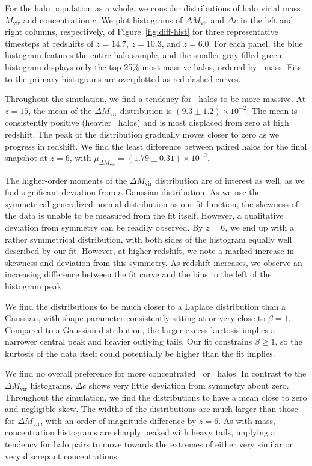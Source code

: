 For the halo population as a whole, we consider distributions of halo virial mass $M_{\mathrm{vir}}$ and concentration $c$.  We plot histograms of $\Delta M_{\mathrm{vir}}$ and $\Delta c$ in the left and right columns, respectively, of Figure~\ref{fig:diff-hist} for three representative timesteps at redshifts of $z = 14.7$, $z = 10.3$, and $z = 6.0$.  For each panel, the blue histogram features the entire halo sample, and the smaller gray-filled green histogram displays only the top 25\% most massive halos, ordered by \lpt\ mass.  Fits to the primary histograms are overplotted as red dashed curves.

Throughout the simulation, we find a tendency for \lpt\ halos to be more massive.  At $z = 15$, the mean of the $\Delta M_{\mathrm{vir}}$ distribution is $(9.3 \pm 1.2) \times 10^{-2}$.  The mean is consistently positive (heavier \lpt\ halos) and is most displaced from zero at high redshift.  The peak of the distribution gradually moves closer to zero as we progress in redshift.  We find the least difference between paired halos for the final snapshot at $z = 6$, with $\mu_{\Delta M_{\mathrm{vir}}} = (1.79 \pm 0.31) \times 10^{-2}$.

The higher-order moments of the $\Delta M_{\mathrm{vir}}$ distribution are of interest as well, as we find significant deviation from a Gaussian distribution.  As we use the symmetrical generalized normal distribution as our fit function, the skewness of the data is unable to be measured from the fit itself.  However, a qualitative deviation from symmetry can be readily observed.  By $z = 6$, we end up with a rather symmetrical distribution, with both sides of the histogram equally well described by our fit.  However, at higher redshift, we note a marked increase in skewness and deviation from this symmetry.  As redshift increases, we observe an increasing difference between the fit curve and the bins to the left of the histogram peak.

We find the distributions to be much closer to a Laplace distribution than a Gaussian, with shape parameter consistently sitting at or very close to $\beta = 1$.  Compared to a Gaussian distribution, the larger excess kurtosis implies a narrower central peak and heavier outlying tails.  Our fit constrains $\beta \geq 1$, so the kurtosis of the data itself could potentially be higher than the fit implies.

We find no overall preference for more concentrated \lpt\ or \za\ halos.  In contrast to the $\Delta M_{\mathrm{vir}}$ histograms, $\Delta c$ shows very little deviation from symmetry about zero.  Throughout the simulation, we find the distributions to have a mean close to zero and negligible skew.  The widths of the distributions are much larger than those for $\Delta M_{\mathrm{vir}}$, with an order of magnitude difference by $z = 6$.  As with mass, concentration histograms are sharply peaked with heavy tails, implying a tendency for halo pairs to move towards the extremes of either very similar or very discrepant concentrations.




